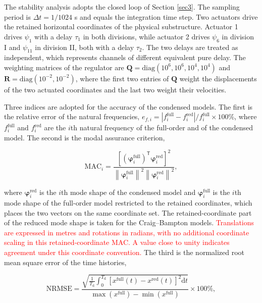 \documentclass[a4paper,fleqn,review,12pt]{cas-sc}
\numberwithin{equation}{section}
\newcommand{\rev}[1]{\textcolor{red}{#1}}
\begin{document}
The stability analysis adopts the closed loop of Section \ref{sec3}. The sampling period is \(\Delta t=1/1024\) s and equals the integration time step. Two actuators drive the retained horizontal coordinates of the physical substructure. Actuator 1 drives \(\psi_{1}\) with a delay \(\tau_{1}\) in both divisions, while actuator 2 drives \(\psi_{6}\) in division I and \(\psi_{11}\) in division II, both with a delay \(\tau_{2}\). The two delays are treated as independent, which represents channels of different equivalent pure delay. The weighting matrices of the regulator are \(\mathbf{Q}=\mathrm{diag}(10^{6},10^{6},10^{4},10^{4})\) and \(\mathbf{R}=\mathrm{diag}(10^{-2},10^{-2})\), where the first two entries of \(\mathbf{Q}\) weight the displacements of the two actuated coordinates and the last two weight their velocities.

Three indices are adopted for the accuracy of the condensed models. The first is the relative error of the natural frequencies, \(e_{f,i}=|f_{i}^{\mathrm{full}}-f_{i}^{\mathrm{red}}|/f_{i}^{\mathrm{full}}\times100\%\), where \(f_{i}^{\mathrm{full}}\) and \(f_{i}^{\mathrm{red}}\) are the \(i\)th natural frequency of the full-order and of the condensed model. The second is the modal assurance criterion,

\vspace{-3.5em}
\begin{equation}
	\mathrm{MAC}_{i}=
	\frac{\left[\left(\bm{\varphi}_{i}^{\mathrm{full}}\right)^{\mathsf{T}}
		\bm{\varphi}_{i}^{\mathrm{red}}\right]^{2}}
	{\left\|\bm{\varphi}_{i}^{\mathrm{full}}\right\|^{2}
		\left\|\bm{\varphi}_{i}^{\mathrm{red}}\right\|^{2}},
	\label{eq:mac}
\end{equation}
\vspace{-3.5em}

\noindent where \(\bm{\varphi}_{i}^{\mathrm{red}}\) is the \(i\)th mode shape of the condensed model and \(\bm{\varphi}_{i}^{\mathrm{full}}\) is the \(i\)th mode shape of the full-order model restricted to the retained coordinates, which places the two vectors on the same coordinate set. The retained-coordinate part of the reduced mode shape is taken for the Craig--Bampton models. \rev{Translations are expressed in metres and rotations in radians, with no additional coordinate scaling in this retained-coordinate MAC. A value close to unity indicates agreement under this coordinate convention.} The third is the normalized root mean square error of the time histories,

\vspace{-3.5em}
\begin{equation}
	\mathrm{NRMSE}=
	\frac{\displaystyle\sqrt{\frac{1}{T_{\mathrm{d}}}\int_{0}^{T_{\mathrm{d}}}
			\left[x^{\mathrm{full}}(t)-x^{\mathrm{red}}(t)\right]^{2}\mathrm{d}t}}
	{\max\left(x^{\mathrm{full}}\right)-\min\left(x^{\mathrm{full}}\right)}
	\times100\%,
	\label{eq:nrmse}
\end{equation}
\vspace{-3.5em}
\end{document}
